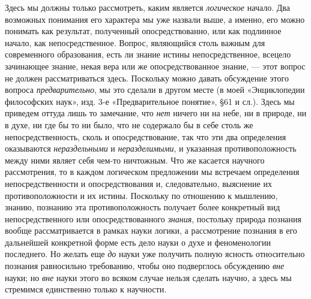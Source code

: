 Здесь мы должны только рассмотреть, каким является
{\em логическое} начало. Два возможных понимания его
характера мы уже назвали выше, а именно, его можно понимать как результат,
полученный опосредствованно, или как подлинное начало, как
непосредственное. Вопрос, являющийся столь важным для современного
образования, есть ли знание истины непосредственное, всецело зачинающее
знание, некая вера или же опосредствованное знание, — этот вопрос не должен
рассматриваться здесь. Поскольку можно давать обсуждение этого вопроса
{\em предварительно}, мы это сделали в другом месте (в
моей «Энциклопедии философских наук», изд. 3-е «Предварительное понятие»,
§61 и сл.). Здесь мы приведем оттуда лишь то замечание, что
{\em нет} ничего ни на небе, ни в природе, ни в духе,
ни где бы то ни было, что не содержало бы в себе столь же
непосредственность, сколь и опосредствование, так что эти два определения
оказываются {\em нераздельными} и
{\em неразделимыми}, и указанная противоположность
между ними являет себя чем-то ничтожным. Что же касается научного
рассмотрения, то в каждом логическом предложении мы встречаем определения
непосредственности и опосредствования и, следовательно, выяснение их
противоположности и их истины. Поскольку по отношению к мышлению, знанию,
познанию эта противоположность получает более конкретный вид
непосредственного или опосредствованного {\em знания},
постольку природа познания вообще рассматривается в рамках науки логики, а
рассмотрение познания в его дальнейшей конкретной форме есть дело науки о
духе и феноменологии последнего. Но желать еще {\em до}
науки уже получить полную ясность относительно познания равносильно
требованию, чтобы оно подверглось обсуждению {\em вне}
науки; но {\em вне} науки этого во всяком случае нельзя
сделать научно, а здесь мы стремимся единственно только к научности.

